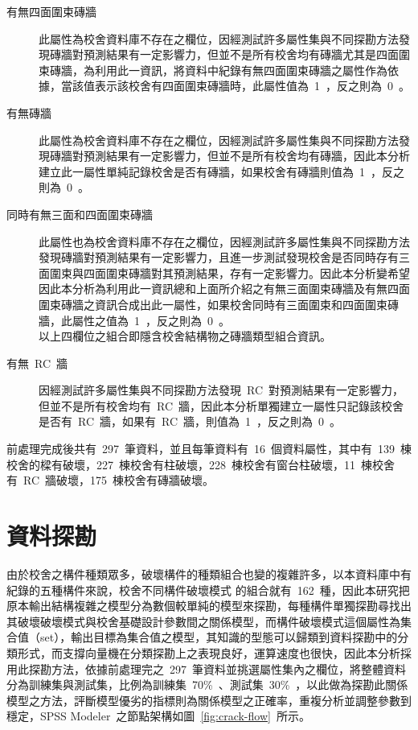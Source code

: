 \begin{description}
  \item[有無四面圍束磚牆]
  此屬性為校舍資料庫不存在之欄位，因經測試許多屬性集與不同探勘方法發現磚牆對預測結果有一定影響力，但並不是所有校舍均有磚牆尤其是四面圍束磚牆，為利用此一資訊，將資料中紀錄有無四面圍束磚牆之屬性作為依據，當該值表示該校舍有四面圍束磚牆時，此屬性值為~1~，反之則為~0~。
  \item[有無磚牆]
  此屬性為校舍資料庫不存在之欄位，因經測試許多屬性集與不同探勘方法發現磚牆對預測結果有一定影響力，但並不是所有校舍均有磚牆，因此本分析建立此一屬性單純記錄校舍是否有磚牆，如果校舍有磚牆則值為~1~，反之則為~0~。
  \item[同時有無三面和四面圍束磚牆]
  此屬性也為校舍資料庫不存在之欄位，因經測試許多屬性集與不同探勘方法發現磚牆對預測結果有一定影響力，且進一步測試發現校舍是否同時存有三面圍束與四面圍束磚牆對其預測結果，存有一定影響力。因此本分析變希望因此本分析為利用此一資訊總和上面所介紹之有無三面圍束磚牆及有無四面圍束磚牆之資訊合成出此一屬性，如果校舍同時有三面圍束和四面圍束磚牆，此屬性之值為~1~，反之則為~0~。\\
  以上四欄位之組合即隱含校舍結構物之磚牆類型組合資訊。
  \item[有無~RC~牆]
  因經測試許多屬性集與不同探勘方法發現~RC~對預測結果有一定影響力，但並不是所有校舍均有~RC~牆，因此本分析單獨建立一屬性只記錄該校舍是否有~RC~牆，如果有~RC~牆，則值為~1~，反之則為~0~。
\end{description}

前處理完成後共有~297~筆資料，並且每筆資料有~16~個資料屬性，其中有~139~棟校舍的樑有破壞，227~棟校舍有柱破壞，228~棟校舍有窗台柱破壞，11~棟校舍有~RC~牆破壞，175~棟校舍有磚牆破壞。

\section{資料探勘}

由於校舍之構件種類眾多，破壞構件的種類組合也變的複雜許多，以本資料庫中有紀錄的五種構件來說，校舍不同構件破壞模式  的組合就有~162~種，因此本研究把原本輸出結構複雜之模型分為數個較單純的模型來探勘，每種構件單獨探勘尋找出其破壞破壞模式與校舍基礎設計參數間之關係模型，而構件破壞模式這個屬性為集合值（set），輸出目標為集合值之模型，其知識的型態可以歸類到資料探勘中的分類形式，而支撐向量機在分類探勘上之表現良好，運算速度也很快，因此本分析採用此探勘方法，依據前處理完之~297~筆資料並挑選屬性集內之欄位，將整體資料分為訓練集與測試集，比例為訓練集~70\%~、測試集~30\%~，以此做為探勘此關係模型之方法，評斷模型優劣的指標則為關係模型之正確率，重複分析並調整參數到穩定，SPSS Modeler~之節點架構如圖~\ref{fig:crack-flow}~所示。

